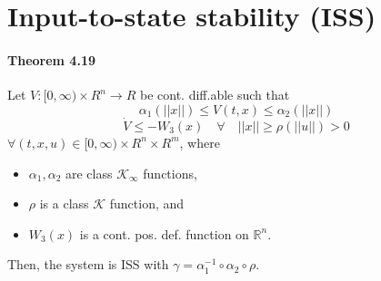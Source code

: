 \section{Input-to-state stability (ISS)}

\paragraph{Theorem 4.19}
Let $V : [0,\infty) \times R^n \rightarrow R$ be cont. diff.able such that
\begin{equation}
	\alpha_1(||x||) \leq V(t,x) \leq \alpha_2(||x||)
\end{equation}
\begin{equation}
	\dot{V} \leq -W_3(x) \quad \forall \quad ||x|| \geq \rho(||u||) > 0
\end{equation}
$\forall (t,x,u) \in [0,\infty) \times R^n \times R^m$, where
\begin{itemize}
	\item $\alpha_1, \alpha_2$ are class $\mathcal{K}_\infty$ functions,
	\item $\rho$ is a class $\mathcal{K}$ function, and
	\item $W_3(x)$ is a cont. pos. def. function on $\mathbb{R}^n$.
\end{itemize}
Then, the system is ISS with $\gamma=\alpha_1^{-1} \circ \alpha_2 \circ \rho$.